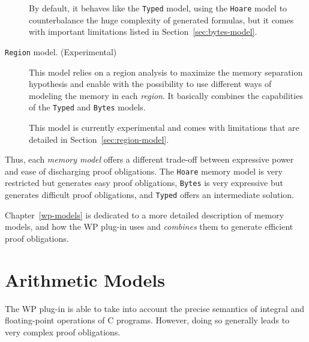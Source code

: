 \begin{description}
  By default, it behaves like the \texttt{Typed} model, using the \texttt{Hoare}
  model to counterbalance the huge complexity of generated formulas, but it
  comes with important limitations listed in Section~\ref{sec:bytes-model}.

\item[\texttt{Region} model. (Experimental)] This model relies on a region
  analysis to maximize the memory separation hypothesis and enable with the
  possibility to use different ways of modeling the memory in each
  \textit{region}. It basically combines the capabilities of the \texttt{Typed}
  and \texttt{Bytes} models.\par

  This model is currently experimental and comes with limitations that are
  detailed in Section~\ref{sec:region-model}.

\end{description}

Thus, each \emph{memory model} offers a different trade-off between
expressive power and ease of discharging proof obligations. The
\texttt{Hoare} memory model is very restricted but generates easy proof
obligations, \texttt{Bytes} is very expressive but generates difficult
proof obligations, and \texttt{Typed} offers an intermediate solution.

Chapter~\ref{wp-models} is dedicated to a more detailed description of
memory models, and how the \textsf{WP} plug-in uses and \emph{combines}
them to generate efficient proof obligations.


\section{Arithmetic Models}
\label{wp-model-arith}

The \textsf{WP} plug-in is able to take into account the precise
semantics of integral and floating-point operations of \textsf{C}
programs. However, doing so generally leads to very complex proof obligations.

